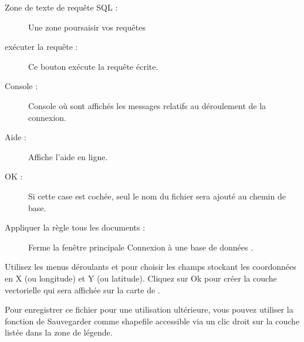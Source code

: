 \begin{description}
\item[Zone de texte de requête SQL :] Une zone poursaisir vos requêtes
\item[exécuter la requête :] Ce bouton exécute la requête écrite.
\item[Console :] Console où sont affichés les messages relatifs au déroulement de la connexion.
\item[Aide :] Affiche l'aide en ligne.
\item[OK :] Si cette case est cochée, seul le nom du fichier sera ajouté au chemin de base.
\item[Appliquer la règle tous les documents :] Ferme la fenêtre principale Connexion à une base de données .
\end{description}


Utilisez les menus déroulants  et  pour choisir les champs stockant les coordonnées en X  (ou longitude) et Y  (ou latitude). Cliquez sur Ok pour créer la couche vectorielle qui sera affichée sur la carte de \qg.


Pour enregistrer ce fichier pour une utilisation ultérieure, vous pouvez utiliser la fonction de \qg Sauvegarder comme shapefile  accessible via un clic droit sur la couche listée dans la zone de légende.

